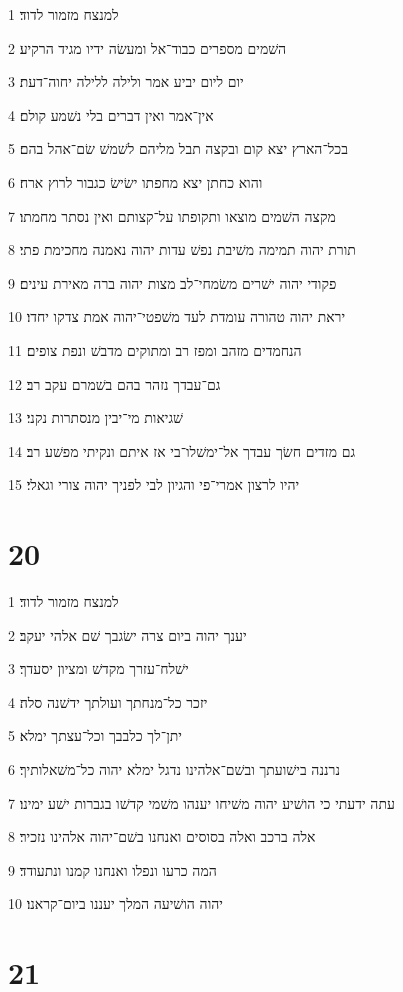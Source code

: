 \par 1 למנצח מזמור לדוד׃
\par 2 השׁמים מספרים כבוד־אל ומעשׂה ידיו מגיד הרקיע׃
\par 3 יום ליום יביע אמר ולילה ללילה יחוה־דעת׃
\par 4 אין־אמר ואין דברים בלי נשׁמע קולם׃
\par 5 בכל־הארץ יצא קום ובקצה תבל מליהם לשׁמשׁ שׂם־אהל בהם׃
\par 6 והוא כחתן יצא מחפתו ישׂישׂ כגבור לרוץ ארח׃
\par 7 מקצה השׁמים מוצאו ותקופתו על־קצותם ואין נסתר מחמתו׃
\par 8 תורת יהוה תמימה משׁיבת נפשׁ עדות יהוה נאמנה מחכימת פתי׃
\par 9 פקודי יהוה ישׁרים משׂמחי־לב מצות יהוה ברה מאירת עינים׃
\par 10 יראת יהוה טהורה עומדת לעד משׁפטי־יהוה אמת צדקו יחדו׃
\par 11 הנחמדים מזהב ומפז רב ומתוקים מדבשׁ ונפת צופים׃
\par 12 גם־עבדך נזהר בהם בשׁמרם עקב רב׃
\par 13 שׁגיאות מי־יבין מנסתרות נקני׃
\par 14 גם מזדים חשׂך עבדך אל־ימשׁלו־בי אז איתם ונקיתי מפשׁע רב׃
\par 15 יהיו לרצון אמרי־פי והגיון לבי לפניך יהוה צורי וגאלי׃

\chapter{20}

\par 1 למנצח מזמור לדוד׃
\par 2 יענך יהוה ביום צרה ישׂגבך שׁם אלהי יעקב׃
\par 3 ישׁלח־עזרך מקדשׁ ומציון יסעדך׃
\par 4 יזכר כל־מנחתך ועולתך ידשׁנה סלה׃
\par 5 יתן־לך כלבבך וכל־עצתך ימלא׃
\par 6 נרננה בישׁועתך ובשׁם־אלהינו נדגל ימלא יהוה כל־משׁאלותיך׃
\par 7 עתה ידעתי כי הושׁיע יהוה משׁיחו יענהו משׁמי קדשׁו בגברות ישׁע ימינו׃
\par 8 אלה ברכב ואלה בסוסים ואנחנו בשׁם־יהוה אלהינו נזכיר׃
\par 9 המה כרעו ונפלו ואנחנו קמנו ונתעודד׃
\par 10 יהוה הושׁיעה המלך יעננו ביום־קראנו׃

\chapter{21}

